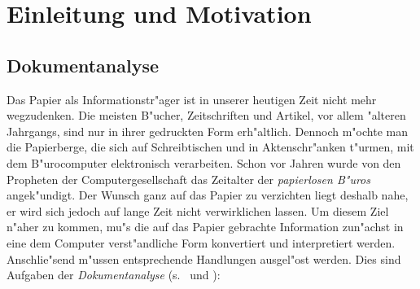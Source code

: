 \chapter{Einleitung und Motivation}
\section{Dokumentanalyse}
\label{DokAna}

Das Papier als Informationstr"ager ist in unserer heutigen Zeit nicht
mehr wegzudenken. Die meisten B"ucher, Zeitschriften und Artikel, vor
allem "alteren Jahrgangs, sind nur in ihrer gedruckten Form
erh"altlich. Dennoch m"ochte man die Papierberge, die sich auf
Schreibtischen und in Aktenschr"anken t"urmen, mit dem
B"urocomputer elektronisch verarbeiten. 
Schon vor Jahren wurde von den Propheten der Computergesellschaft das
Zeitalter der {\em papierlosen B"uros\/} angek"undigt. 
Der Wunsch ganz auf das Papier
zu verzichten liegt deshalb nahe, er wird sich jedoch auf lange Zeit nicht verwirklichen lassen.
Um diesem Ziel n"aher zu kommen, mu"s die
auf das Papier gebrachte Information zun"achst in eine dem Computer
verst"andliche Form konvertiert und interpretiert werden. Anschlie"send m"ussen
entsprechende Handlungen ausgel"ost werden. Dies sind Aufgaben der
{\em Dokumentanalyse\/} (s.\  und
\cite{PixelToContents}):


